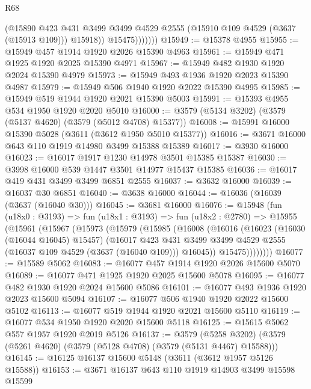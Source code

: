 \begin{lexlean}{R68}
\begin{coremodule}
                    (@15890
                      @423
                      @431
                      @3499
                      @3499
                      @4529
                      @2555
                      (@15910 @109 @4529 (@3637 (@15913 @109)))
                      @15918))
                  @15475)))))))
@15949 := @15378 @4955
@15955 := @15949 @457 @1914 @1920 @2026 @15390 @4963
@15961 := @15949 @471 @1925 @1920 @2025 @15390 @4971
@15967 := @15949 @482 @1930 @1920 @2024 @15390 @4979
@15973 := @15949 @493 @1936 @1920 @2023 @15390 @4987
@15979 := @15949 @506 @1940 @1920 @2022 @15390 @4995
@15985 := @15949 @519 @1944 @1920 @2021 @15390 @5003
@15991 := @15393 @4955 @534 @1950 @1920 @2020 @5010
@16000 := @3579 (@5134 @3202) (@3579 (@5137 @4620) (@3579 (@5012 @4708) @15377))
@16008 := @15991 @16000 @15390 @5028 (@3611 (@3612 @1950 @5010 @15377))
@16016 := @3671 @16000 @643 @110 @1919 @14980 @3499 @15388 @15389
@16017 := @3930 @16000
@16023 := @16017 @1917 @1230 @14978 @3501 @15385 @15387
@16030 := @3998 @16000 @539 @1447 @3501 @14977 @15437 @15385
@16036 := @16017 @419 @431 @3499 @3499 @6851 @2555
@16037 := @3632 @16000
@16039 := @16037 @30 @6851
@16040 := @3638 @16000
@16044 := @16036 (@16039 (@3637 (@16040 @30)))
@16045 := @3681 @16000
@16076 := @15948
    (fun (u18x0 : @3193) =>
    fun (u18x1 : @3193) =>
    fun (u18x2 : @2780) =>
    @15955
      (@15961
        (@15967
          (@15973
            (@15979
              (@15985
                (@16008
                  (@16016
                    (@16023
                      (@16030 (@16044 @16045) @15457)
                      (@16017
                        @423
                        @431
                        @3499
                        @3499
                        @4529
                        @2555
                        (@16037 @109 @4529 (@3637 (@16040 @109)))
                        @16045))
                    @15475))))))))
@16077 := @15589 @5062
@16083 := @16077 @457 @1914 @1920 @2026 @15600 @5070
@16089 := @16077 @471 @1925 @1920 @2025 @15600 @5078
@16095 := @16077 @482 @1930 @1920 @2024 @15600 @5086
@16101 := @16077 @493 @1936 @1920 @2023 @15600 @5094
@16107 := @16077 @506 @1940 @1920 @2022 @15600 @5102
@16113 := @16077 @519 @1944 @1920 @2021 @15600 @5110
@16119 := @16077 @534 @1950 @1920 @2020 @15600 @5118
@16125 := @15615 @5062 @557 @1957 @1920 @2019 @5126
@16137 := @3579
    (@5258 @3202)
    (@3579 (@5261 @4620) (@3579 (@5128 @4708) (@3579 (@5131 @4467) @15588)))
@16145 := @16125 @16137 @15600 @5148 (@3611 (@3612 @1957 @5126 @15588))
@16153 := @3671 @16137 @643 @110 @1919 @14903 @3499 @15598 @15599

\end{coremodule}
\end{lexlean}
